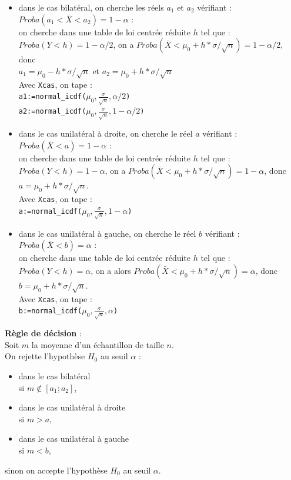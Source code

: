 \documentclass[a4paper,11pt]{book}
\begin{document}
\begin{itemize} 
\item  dans le cas bilat\'eral, on cherche les r\'eels 
$a_1$ et $a_2$ v\'erifiant :\\
$Proba(a_1<\bar X<a_2)=1-\alpha$ :\\
on cherche dans une table de loi centr\'ee r\'eduite $h$ tel que :\\
$Proba(Y<h)=1-\alpha/2$, on a $Proba(\bar X<\mu_0+h*\sigma/\sqrt n)=1-\alpha/2$, donc \\
$a_1=\mu_0-h*\sigma/\sqrt n$ et
$a_2=\mu_0+h*\sigma/\sqrt n$\\
Avec {\tt Xcas}, on tape :\\
{\tt a1:=normal\_icdf($\mu_0,\frac{\sigma}{\sqrt n},\alpha/2$)}\\
{\tt a2:=normal\_icdf($\mu_0,\frac{\sigma}{\sqrt n},1-\alpha/2$)}
\item  dans le cas unilat\'eral \`a droite, on cherche le r\'eel 
$a$ v\'erifiant :\\
$Proba(\bar X<a)=1-\alpha$ :\\
on cherche dans une table de loi centr\'ee r\'eduite $h$ tel que :\\
$Proba(Y<h)=1-\alpha$, on a $Proba(\bar X<\mu_0+h*\sigma/\sqrt n)=1-\alpha$,
 donc \\
$a=\mu_0+h*\sigma/\sqrt n$.\\ 
Avec {\tt Xcas}, on tape :\\
{\tt a:=normal\_icdf($\mu_0,\frac{\sigma}{\sqrt n},1-\alpha$)}
\item dans le cas unilat\'eral \`a gauche, on cherche le r\'eel 
$b$ v\'erifiant :\\
$Proba(\bar X<b)=\alpha$ :\\
on cherche dans une table de loi centr\'ee r\'eduite $h$ tel que :\\
$Proba(Y<h)=\alpha$, on a alors $Proba(\bar X<\mu_0+h*\sigma/\sqrt n)=\alpha$, 
donc \\
$b=\mu_0+h*\sigma/\sqrt n$.\\ 
Avec {\tt Xcas}, on tape :\\
{\tt b:=normal\_icdf($\mu_0,\frac{\sigma}{\sqrt n },\alpha$)}
\end{itemize}
{\bf R\`egle de d\'ecision} :\\
Soit $m$ la moyenne d'un \'echantillon de taille $n$.\\
On rejette l'hypoth\`ese $H_0$ au seuil $\alpha$ :
\begin{itemize}
\item dans le cas bilat\'eral\\ 
si $m \not\in [a_1;a_2]$,
\item dans le cas unilat\'eral \`a droite\\
si $m>a$,
\item dans le cas unilat\'eral \`a gauche\\
si $m<b$, 
\end{itemize}
sinon on accepte l'hypoth\`ese $H_0$ au seuil $\alpha$.
\end{document}
